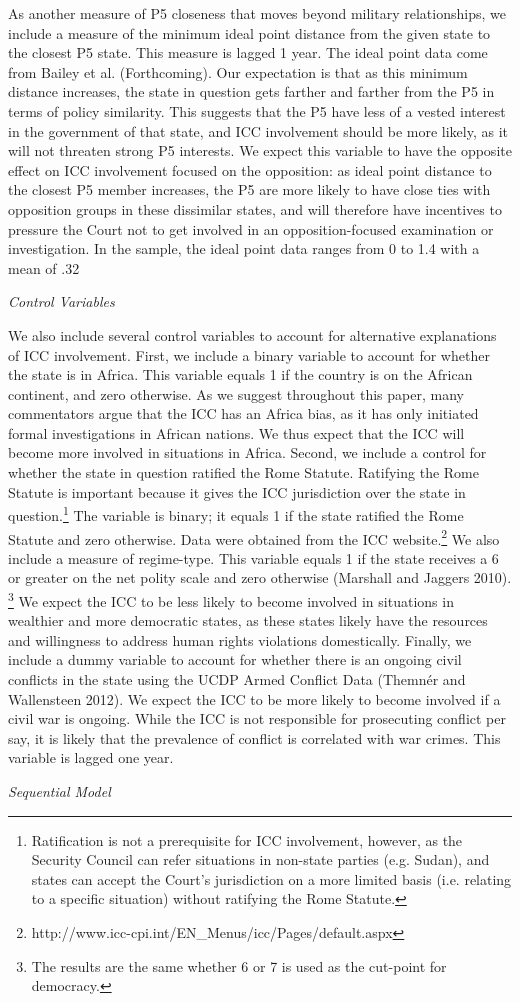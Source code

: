 As another measure of P5 closeness that moves beyond military relationships, we include a measure of the minimum ideal point distance from the given state to the closest P5 state. This measure is lagged 1 year. The ideal point data come from Bailey et al. (Forthcoming). Our expectation is that as this minimum distance increases, the state in question gets farther and farther from the P5 in terms of policy similarity. This suggests that the P5 have less of a vested interest in the government of that state, and ICC involvement should be more likely, as it will not threaten strong P5 interests. We expect this variable to have the opposite effect on ICC involvement focused on the opposition: as ideal point distance to the closest P5 member increases, the P5 are more likely to have close ties with opposition groups in these dissimilar states, and will therefore have incentives to pressure the Court not to get involved in an opposition-focused examination or investigation. In the sample, the ideal point data ranges from 0 to 1.4 with a mean of .32

\emph{Control Variables }

We also include several control variables to account for alternative explanations of ICC involvement. First, we include a binary variable to account for whether the state is in Africa. This variable equals 1 if the country is on the African continent, and zero otherwise. As we suggest throughout this paper, many commentators argue that the ICC has an Africa bias, as it has only initiated formal investigations in African nations. We thus expect that the ICC will become more involved in situations in Africa. Second, we include a control for whether the state in question ratified the Rome Statute. Ratifying the Rome Statute is important because it gives the ICC jurisdiction over the state in question.\footnote{Ratification is not a prerequisite for ICC involvement, however, as the Security Council can refer situations in non-state parties (e.g. Sudan), and states can accept the Court's jurisdiction on a more limited basis (i.e. relating to a specific situation) without ratifying the Rome Statute.} The variable is binary; it equals 1 if the state ratified the Rome Statute and zero otherwise. Data were obtained from the ICC website.\footnote{http://www.icc-cpi.int/EN\_Menus/icc/Pages/default.aspx} We also include a measure of regime-type. This variable equals 1 if the state receives a 6 or greater on the net polity scale and zero otherwise (Marshall and Jaggers 2010). \footnote{The results are the same whether 6 or 7 is used as the cut-point for democracy.} We expect the ICC to be less likely to become involved in situations in wealthier and more democratic states, as these states likely have the resources and willingness to address human rights violations domestically. Finally, we include a dummy variable to account for whether there is an ongoing civil conflicts in the state using the UCDP Armed Conflict Data (Themnér and Wallensteen 2012). We expect the ICC to be more likely to become involved if a civil war is ongoing. While the ICC is not responsible for prosecuting conflict per say, it is likely that the prevalence of conflict is correlated with war crimes. This variable is lagged one year.

\emph{Sequential Model}

